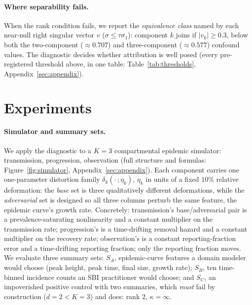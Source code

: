 \documentclass{article}
\begin{document}
\paragraph{Where separability fails.}
When the rank condition fails, we report the \emph{equivalence class} named by each near-null
right singular vector $v$ ($\sigma \le \tau\sigma_1$): component
$k$ joins if $|v_k|\ge 0.3$, below both the two-component ($\approx 0.707$) and
three-component ($\approx 0.577$) confound values. The diagnostic decides whether attribution
is well posed (every pre-registered threshold above, in one table:
Table~\ref{tab:thresholds}, Appendix~\ref{sec:appendix}).

\section{Experiments}
\label{sec:experiments}

\paragraph{Simulator and summary sets.}
We apply the diagnostic to a $K=3$ compartmental epidemic simulator: transmission,
progression, observation (full structure and formulas: Figure~\ref{fig:simulator},
Appendix~\ref{sec:appendix}). Each component carries one one-parameter distortion family
$\delta_k(\cdot\,;\eta_k)$, $\eta_k$ in units of a fixed $10\%$ relative deformation: the
\emph{base} set is three qualitatively different deformations, while the \emph{adversarial} set
is designed so all three columns perturb the same feature, the epidemic curve's growth rate.
Concretely: transmission's
base/adversarial pair is a prevalence-saturating nonlinearity and a constant multiplier on the
transmission rate; progression's is a time-drifting removal hazard and a constant multiplier on
the recovery rate; observation's is a constant reporting-fraction error and a time-drifting
reporting fraction; only the reporting fraction moves. We evaluate three summary sets: $S_A$, epidemic-curve features a
domain modeler would choose (peak height, peak time, final size, growth rate); $S_B$, ten
time-binned incidence counts an SBI practitioner would choose; and $S_C$, an impoverished
positive control with two summaries, which \emph{must} fail by construction ($d=2<K=3$) and
does: rank 2, $\kappa=\infty$.
\end{document}
